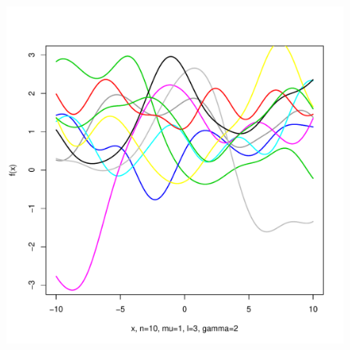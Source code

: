 \documentclass[12pt,letterpaper]{article}
\begin{document}
\begin{figure}
\begin{center}
\includegraphics[scale=0.2]{hw321/n10-m1-l3-g4.pdf}
\end{center}
\end{figure} 
\end{document}
